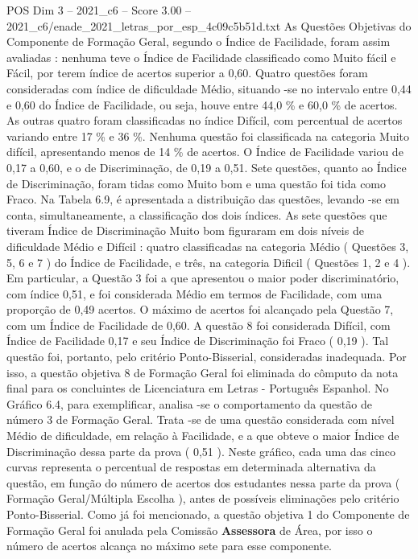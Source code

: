 \begin{textsample}{POS Dim 3 – 2021\_c6 – Score 3.00 – 2021\_c6/enade\_2021\_letras\_por\_esp\_4c09c5b51d.txt}
As Questões Objetivas do Componente de Formação Geral, segundo o Índice de Facilidade, foram assim avaliadas : nenhuma teve o Índice de Facilidade classificado como Muito fácil e Fácil, por terem índice de acertos superior a 0,60.
Quatro questões foram consideradas com índice de dificuldade Médio, situando -se no intervalo entre 0,44 e 0,60 do Índice de Facilidade, ou seja, houve entre 44,0 \% e 60,0 \% de acertos.
As outras quatro foram classificadas no índice Difícil, com percentual de acertos variando entre 17 \% e 36 \%.
Nenhuma questão foi classificada na categoria Muito difícil, apresentando menos de 14 \% de acertos.
O Índice de Facilidade variou de 0,17 a 0,60, e o de Discriminação, de 0,19 a 0,51.
Sete questões, quanto ao Índice de Discriminação, foram tidas como Muito bom e uma questão foi tida como Fraco.
Na Tabela 6.9, é apresentada a distribuição das questões, levando -se em conta, simultaneamente, a classificação dos dois índices.
As sete questões que tiveram Índice de Discriminação Muito bom figuraram em dois níveis de dificuldade Médio e Difícil : quatro classificadas na categoria Médio ( Questões 3, 5, 6 e 7 ) do Índice de Facilidade, e três, na categoria Dificil ( Questões 1, 2 e 4 ).
Em particular, a Questão 3 foi a que apresentou o maior poder discriminatório, com índice 0,51, e foi considerada Médio em termos de Facilidade, com uma proporção de 0,49 acertos.
O máximo de acertos foi alcançado pela Questão 7, com um Índice de Facilidade de 0,60.
A questão 8 foi considerada Difícil, com Índice de Facilidade 0,17 e seu Índice de Discriminação foi Fraco ( 0,19 ).
Tal questão foi, portanto, pelo critério Ponto-Bisserial, consideradas inadequada.
Por isso, a questão objetiva 8 de Formação Geral foi eliminada do cômputo da nota final para os concluintes de Licenciatura em Letras - Português Espanhol.
No Gráfico 6.4, para exemplificar, analisa -se o comportamento da questão de número 3 de Formação Geral.
Trata -se de uma questão considerada com nível Médio de dificuldade, em relação à Facilidade, e a que obteve o maior Índice de Discriminação dessa parte da prova ( 0,51 ).
Neste gráfico, cada uma das cinco curvas representa o percentual de respostas em determinada alternativa da questão, em função do número de acertos dos estudantes nessa parte da prova ( Formação Geral/Múltipla Escolha ), antes de possíveis eliminações pelo critério Ponto-Bisserial.
Como já foi mencionado, a questão objetiva 1 do Componente de Formação Geral foi anulada pela Comissão \textbf{Assessora} de Área, por isso o número de acertos alcança no máximo sete para esse componente.

\end{textsample}
